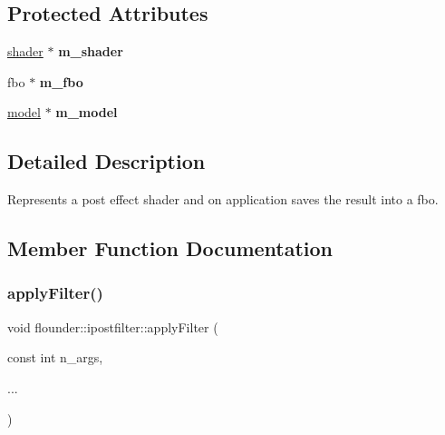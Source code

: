 \subsection*{Protected Attributes}
\begin{DoxyCompactItemize}
\item 
\mbox{\label{classflounder_1_1ipostfilter_ab197a81f28df26a38b3302914d6f42fc}} 
\hyperlink{classflounder_1_1shader}{shader} $\ast$ {\bfseries m\+\_\+shader}
\item 
\mbox{\label{classflounder_1_1ipostfilter_a654b609c29c61f0232126d47de77b00a}} 
fbo $\ast$ {\bfseries m\+\_\+fbo}
\item 
\mbox{\label{classflounder_1_1ipostfilter_abf1adae588040bf18dd205f9296f92db}} 
\hyperlink{classflounder_1_1model}{model} $\ast$ {\bfseries m\+\_\+model}
\end{DoxyCompactItemize}


\subsection{Detailed Description}
Represents a post effect shader and on application saves the result into a fbo. 



\subsection{Member Function Documentation}
\mbox{\label{classflounder_1_1ipostfilter_a34cced83864d9d6b1c664a0337cd97b2}} 
\subsubsection{\texorpdfstring{apply\+Filter()}{applyFilter()}}
{\footnotesize\ttfamily void flounder\+::ipostfilter\+::apply\+Filter (\begin{DoxyParamCaption}\item[{const int}]{n\+\_\+args,  }\item[{}]{... }\end{DoxyParamCaption})}



